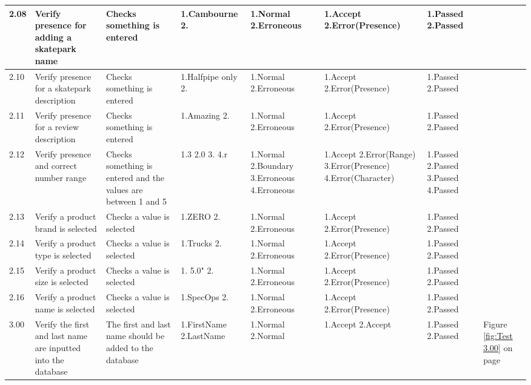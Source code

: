 \begin{landscape}
\begin{center}
\begin{longtable}{|p{1.5cm}|p{2.5cm}|p{2.5cm}|p{2cm}|p{2cm}|p{2cm}|p{2cm}|p{2cm}|}
2.08 & Verify presence for adding a skatepark name & Checks something is entered & 1.Cambourne 2.  & 1.Normal 2.Erroneous & 1.Accept 2.Error(Presence) & 1.Passed 2.Passed & \\ \hline 



2.10 & Verify presence for a skatepark description & Checks something is entered & 1.Halfpipe only 2.  & 1.Normal 2.Erroneous & 1.Accept 2.Error(Presence) & 1.Passed 2.Passed& \\ \hline

2.11 & Verify presence for a review description & Checks something is entered & 1.Amazing 2. & 1.Normal 2.Erroneous & 1.Accept 2.Error(Presence) & 1.Passed 2.Passed & \\ \hline

2.12 & Verify presence and correct number range & Checks something is entered and the values are between 1 and 5 & 1.3 2.0 3. 4.r & 1.Normal 2.Boundary 3.Erroneous 4.Erroneous & 1.Accept 2.Error(Range) 3.Error(Presence) 4.Error(Character) & 1.Passed 2.Passed 3.Passed 4.Passed & \\ \hline

2.13 & Verify a product brand is selected & Checks a value is selected & 1.ZERO 2. & 1.Normal 2.Erroneous & 1.Accept 2.Error(Presence) & 1.Passed 2.Passed & \\ \hline

2.14 & Verify a product type is selected & Checks a value is selected & 1.Trucks 2. & 1.Normal 2.Erroneous & 1.Accept 2.Error(Presence) & 1.Passed 2.Passed & \\ \hline

2.15 & Verify a product size is selected & Checks a value is selected & 1. 5.0" 2. & 1.Normal 2.Erroneous & 1.Accept 2.Error(Presence) & 1.Passed 2.Passed & \\ \hline

2.16 & Verify a product name is selected & Checks a value is selected & 1.SpecOps 2. & 1.Normal 2.Erroneous & 1.Accept 2.Error(Presence) & 1.Passed 2.Passed & \\ \hline





3.00 & Verify the first and last name are inputted into the database & The first and last name should be added to the database & 1.FirstName 2.LastName & 1.Normal 2.Normal & 1.Accept 2.Accept & 1.Passed 2.Passed & Figure \ref{fig:Test 3.00} on page \pageref{fig:Test 3.00}  \\ \hline


\end{longtable}
\end{center}
\end{landscape}
